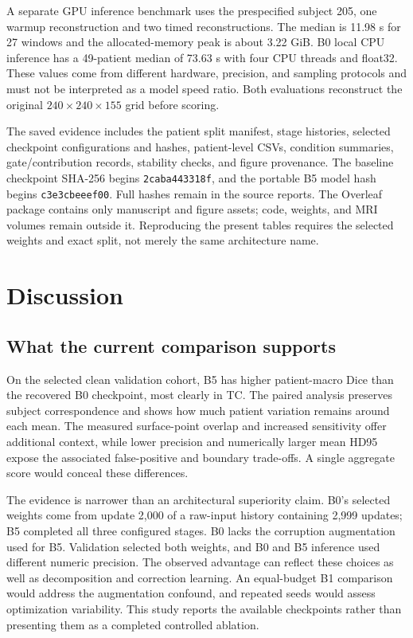 \documentclass[conference]{IEEEtran}
\begin{document}
A separate GPU inference benchmark uses the prespecified subject 205, one warmup reconstruction and two timed reconstructions. The median is 11.98 s for 27 windows and the allocated-memory peak is about 3.22 GiB. B0 local CPU inference has a 49-patient median of 73.63 s with four CPU threads and float32. These values come from different hardware, precision, and sampling protocols and must not be interpreted as a model speed ratio. Both evaluations reconstruct the original $240\times240\times155$ grid before scoring.

The saved evidence includes the patient split manifest, stage histories, selected checkpoint configurations and hashes, patient-level CSVs, condition summaries, gate/contribution records, stability checks, and figure provenance. The baseline checkpoint SHA-256 begins \texttt{2caba443318f}, and the portable B5 model hash begins \texttt{c3e3cbeeef00}. Full hashes remain in the source reports. The Overleaf package contains only manuscript and figure assets; code, weights, and MRI volumes remain outside it. Reproducing the present tables requires the selected weights and exact split, not merely the same architecture name.

\section{Discussion}
\subsection{What the current comparison supports}
On the selected clean validation cohort, B5 has higher patient-macro Dice than the recovered B0 checkpoint, most clearly in TC. The paired analysis preserves subject correspondence and shows how much patient variation remains around each mean. The measured surface-point overlap and increased sensitivity offer additional context, while lower precision and numerically larger mean HD95 expose the associated false-positive and boundary trade-offs. A single aggregate score would conceal these differences.

The evidence is narrower than an architectural superiority claim. B0's selected weights come from update 2,000 of a raw-input history containing 2,999 updates; B5 completed all three configured stages. B0 lacks the corruption augmentation used for B5. Validation selected both weights, and B0 and B5 inference used different numeric precision. The observed advantage can reflect these choices as well as decomposition and correction learning. An equal-budget B1 comparison would address the augmentation confound, and repeated seeds would assess optimization variability. This study reports the available checkpoints rather than presenting them as a completed controlled ablation.
\end{document}
